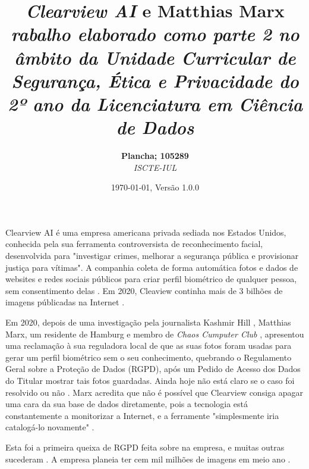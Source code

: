 \documentclass[portuguese, 12pt]{../diazessay}
\title{\textbf{\textit{Clearview AI} e Matthias Marx} \\ {\Large\itshape rabalho elaborado como parte 2 no âmbito da Unidade Curricular de Segurança, Ética e Privacidade do 2º ano da Licenciatura em Ciência de Dados}}
\author{\textbf{Plancha; 105289} \\ \textit{ISCTE-IUL}}
\date{\today , Versão 1.0.0}
\begin{document}
\maketitle
Clearview AI é uma empresa americana privada sediada nos Estados Unidos, conhecida pela sua ferramenta controversista \parencite{nytClearview, CVBan} de reconhecimento facial, desenvolvida para "investigar crimes, melhorar a segurança pública e provisionar justiça para vítimas". A companhia coleta de forma automática fotos e dados de websites e redes sociais públicos para criar perfil biométrico de qualquer pessoa, sem consentimento delas \parencite{EUpresp}. Em 2020, Cleaview continha mais de 3 bilhões de imagens públicadas na Internet \parencite{EUpresp}.

Em 2020, depois de uma investigação pela journalista Kashmir Hill \citeyear{nytClearview}, Matthias Marx, um residente de Hamburg e membro de \textit{Chaos Cumputer Club} \parencite{LegalComp}, apresentou uma reclamação à sua reguladora local de que as suas fotos foram usadas para gerar um perfil biométrico sem o seu conhecimento, quebrando o Regulamento Geral sobre a Proteção de Dados (RGPD), após um Pedido de Acesso dos Dados do Titular mostrar tais fotos guardadas. Ainda hoje não está claro se o caso foi resolvido ou não \parencite{wired}. Marx acredita que não é possível que Clearview consiga apagar uma cara da sua base de dados diretamente, pois a tecnologia está constantemente a monitorizar a Internet, e a ferramente "simplesmente iria catalogá-lo novamente" \parencite{wired}.

Esta foi a primeira queixa de RGPD feita sobre na empresa, e muitas outras sucederam \parencite{LegalComp}. A empresa planeia ter cem mil milhões de imagens em meio ano \parencite{expansion}.


\printbibliography[title=Referências]
\end{document}
